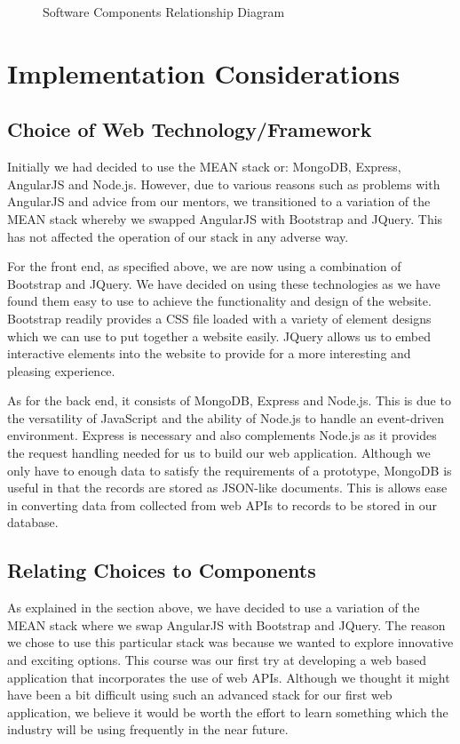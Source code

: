 \documentclass[11pt]{article}
\numberwithin{figure}{section}
\begin{document}
        \begin{figure}[htp]
            \centering
            \caption{Software Components Relationship Diagram}
            \label{}
        \end{figure} 
          
\section{Implementation Considerations}
    \subsection{Choice of Web Technology/Framework}
        Initially we had decided to use the MEAN stack or: MongoDB, Express, AngularJS and Node.js. However, due to various reasons such as problems with AngularJS and advice from our mentors, we transitioned to a variation of the MEAN stack whereby we swapped AngularJS with Bootstrap and JQuery. This has not affected the operation of our stack in any adverse way.
        
        \bigskip
        \noindent
        For the front end, as specified above, we are now using a combination of Bootstrap and JQuery. We have decided on using these technologies as we have found them easy to use to achieve the functionality and design of the website. Bootstrap readily provides a CSS file loaded with a variety of element designs which we can use to put together a website easily. JQuery allows us to embed interactive elements into the website to provide for a more interesting and pleasing experience.
        
        \bigskip
        \noindent
        As for the back end, it consists of MongoDB, Express and Node.js. This is due to the versatility of JavaScript and the ability of Node.js to handle an event-driven environment. Express is necessary and also complements Node.js as it provides the request handling needed for us to build our web application. Although we only have to enough data to satisfy the requirements of a prototype, MongoDB is useful in that the records are stored as JSON-like documents. This is allows ease in converting data from collected from web APIs to records to be stored in our database.
        
    \subsection{Relating Choices to Components}
        As explained in the section above, we have decided to use a variation of the MEAN stack where we swap AngularJS with Bootstrap and JQuery. The reason we chose to use this particular stack was because we wanted to explore innovative and exciting options. This course was our first try at developing a web based application that incorporates the use of web APIs. Although we thought it might have been a bit difficult using such an advanced stack for our first web application, we believe it would be worth the effort to learn something which the industry will be using frequently in the near future.
        
\end{document}
